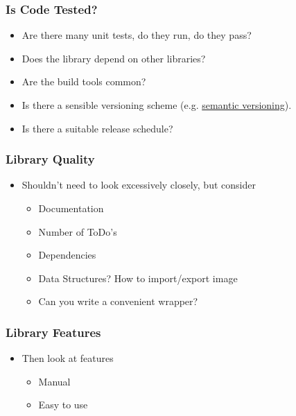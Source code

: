 \subsubsection{Is Code Tested?}\label{is-code-tested}

\begin{itemize}
\itemsep1pt\parskip0pt
\item
  Are there many unit tests, do they run, do they pass?
\item
  Does the library depend on other libraries?
\item
  Are the build tools common?
\item
  Is there a sensible versioning scheme (e.g.
  \href{http://www.semver.org/}{semantic versioning}).
\item
  Is there a suitable release schedule?
\end{itemize}

\subsubsection{Library Quality}\label{library-quality}

\begin{itemize}
\itemsep1pt\parskip0pt
\item
  Shouldn't need to look excessively closely, but consider

  \begin{itemize}
  \itemsep1pt\parskip0pt
  \item
    Documentation
  \item
    Number of ToDo's
  \item
    Dependencies
  \item
    Data Structures? How to import/export image
  \item
    Can you write a convenient wrapper?
  \end{itemize}
\end{itemize}

\subsubsection{Library Features}\label{library-features}

\begin{itemize}
\itemsep1pt\parskip0pt
\item
  Then look at features

  \begin{itemize}
  \itemsep1pt\parskip0pt
  \item
    Manual
  \item
    Easy to use
  \end{itemize}
\end{itemize}

